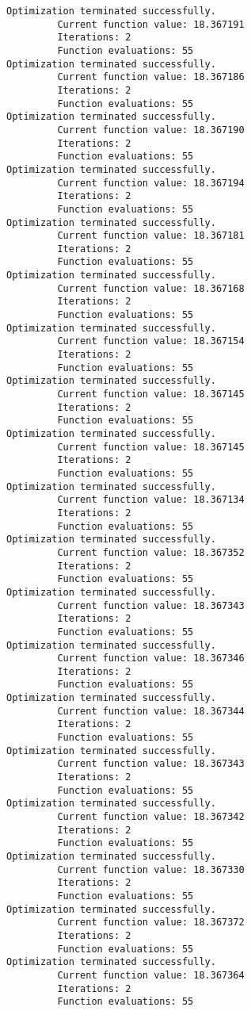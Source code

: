 \documentclass[11pt]{article}
\begin{document}
\begin{Verbatim}[commandchars=\\\{\}]
Optimization terminated successfully.
         Current function value: 18.367191
         Iterations: 2
         Function evaluations: 55
Optimization terminated successfully.
         Current function value: 18.367186
         Iterations: 2
         Function evaluations: 55
Optimization terminated successfully.
         Current function value: 18.367190
         Iterations: 2
         Function evaluations: 55
Optimization terminated successfully.
         Current function value: 18.367194
         Iterations: 2
         Function evaluations: 55
Optimization terminated successfully.
         Current function value: 18.367181
         Iterations: 2
         Function evaluations: 55
Optimization terminated successfully.
         Current function value: 18.367168
         Iterations: 2
         Function evaluations: 55
Optimization terminated successfully.
         Current function value: 18.367154
         Iterations: 2
         Function evaluations: 55
Optimization terminated successfully.
         Current function value: 18.367145
         Iterations: 2
         Function evaluations: 55
Optimization terminated successfully.
         Current function value: 18.367145
         Iterations: 2
         Function evaluations: 55
Optimization terminated successfully.
         Current function value: 18.367134
         Iterations: 2
         Function evaluations: 55
Optimization terminated successfully.
         Current function value: 18.367352
         Iterations: 2
         Function evaluations: 55
Optimization terminated successfully.
         Current function value: 18.367343
         Iterations: 2
         Function evaluations: 55
Optimization terminated successfully.
         Current function value: 18.367346
         Iterations: 2
         Function evaluations: 55
Optimization terminated successfully.
         Current function value: 18.367344
         Iterations: 2
         Function evaluations: 55
Optimization terminated successfully.
         Current function value: 18.367343
         Iterations: 2
         Function evaluations: 55
Optimization terminated successfully.
         Current function value: 18.367342
         Iterations: 2
         Function evaluations: 55
Optimization terminated successfully.
         Current function value: 18.367330
         Iterations: 2
         Function evaluations: 55
Optimization terminated successfully.
         Current function value: 18.367372
         Iterations: 2
         Function evaluations: 55
Optimization terminated successfully.
         Current function value: 18.367364
         Iterations: 2
         Function evaluations: 55

\end{Verbatim}
\end{document}
